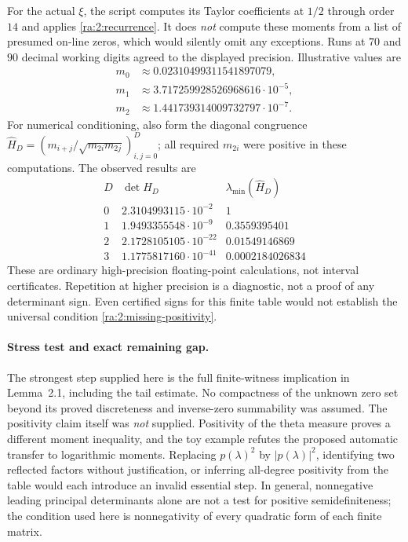 \documentclass[11pt]{article}
\begin{document}
For the actual $\xi$, the script computes its Taylor coefficients at $1/2$
through order $14$ and applies \eqref{ra:2:recurrence}. It does \emph{not}
compute these moments from a list of presumed on-line zeros, which would
silently omit any exceptions. Runs at $70$ and $90$ decimal working digits
agreed to the displayed precision. Illustrative values are
\[
 \begin{aligned}
 m_0&\approx0.02310499311541897079,\\
 m_1&\approx3.717259928526968616\cdot10^{-5},\\
 m_2&\approx1.441739314009732797\cdot10^{-7}.
 \end{aligned}
\]
For numerical conditioning, also form the diagonal congruence
$\widehat H_D=(m_{i+j}/\sqrt{m_{2i}m_{2j}})_{i,j=0}^D$; all required
$m_{2i}$ were positive in these computations. The observed results are
\[
\begin{array}{c|c|c}
 D&\det H_D&\lambda_{\min}(\widehat H_D)\\ \hline
 0&2.3104993115\cdot10^{-2}&1\\
 1&1.9493355548\cdot10^{-9}&0.3559395401\\
 2&2.1728105105\cdot10^{-22}&0.01549146869\\
 3&1.1775817160\cdot10^{-41}&0.0002184026834
\end{array}
\]
These are ordinary high-precision floating-point calculations, not interval
certificates. Repetition at higher precision is a diagnostic, not a proof of
any determinant sign. Even certified signs for this finite table would not
establish the universal condition \eqref{ra:2:missing-positivity}.

\paragraph{Stress test and exact remaining gap.}
The strongest step supplied here is the full finite-witness implication in
Lemma~2.1, including the tail estimate. No compactness of the unknown zero
set beyond its proved discreteness and inverse-zero summability was assumed.
The positivity claim itself was \emph{not} supplied. Positivity of the theta
measure proves a different moment inequality, and the toy example refutes
the proposed automatic transfer to logarithmic moments. Replacing
$p(\lambda)^2$ by $|p(\lambda)|^2$, identifying two reflected factors without
justification, or inferring all-degree positivity from the table would each
introduce an invalid essential step. In general, nonnegative leading
principal determinants alone are not a test for positive semidefiniteness;
the condition used here is nonnegativity of every quadratic form of each
finite matrix.
\end{document}
